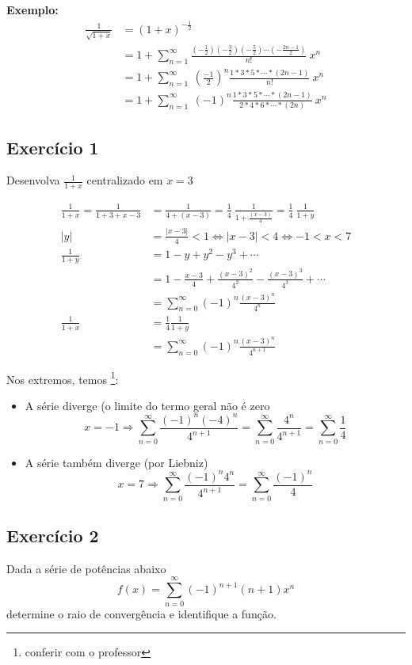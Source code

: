 \documentclass[12pt,openany, letterpaper]{book}
\newcommand{\soma}[2][n]{\sum_{{#1} = #2}^\infty}
\newcommand{\E}[1]{Exercício #1}
\begin{document}
{{\textbf{Exemplo:} \begin{align*}
    \frac{1}{\sqrt{1+x}} &= (1+x)^{-\frac{1}{2}} \\
    &= 1 + \soma{1} \frac{\left(-\frac{1}{2}\right) \left(-\frac{3}{2}\right) \left(-\frac{5}{2}\right) \cdots \left(-\frac{2n-1}{2}\right)}{n!} \ x^n \\
    &= 1 + \soma{1} \ \left(\frac{-1}{2}\right)^n \frac{1 * 3 * 5 * \cdots * (2n-1)}{n!} \ x^n \\
    &= 1 + \soma{1} \ (-1)^n \frac{1*3*5*\cdots*(2n-1)}{2*4*6*\cdots*(2n)} \ x^n
\end{align*}

\subsection*{\E 1} Desenvolva $\displaystyle{\frac{1}{1+x}}$ centralizado em $x=3$

\begin{align*}
    \frac{1}{1+x} = \frac{1}{1+3+x-3} &= \frac{1}{4 + (x-3)} = \frac{1}{4} \ \frac{1}{1 + \frac{(x-3)}{4}} = \frac{1}{4} \ \frac{1}{1+y} \\
    |y| &= \frac{|x-3|}{4} < 1 \Longleftrightarrow |x-3| < 4 \Longleftrightarrow -1 < x < 7 \\
    \frac{1}{1+y} &= 1 - y + y^2 - y^3 + \cdots \\
    &= 1 - \frac{x-3}{4} + \frac{(x-3)^2}{4^2} - \frac{(x-3)^3}{4^3} + \cdots \\
    &= \soma{0} (-1)^n \frac{(x-3)^n}{4^n} \\
    \frac{1}{1+x} &= \frac{1}{4} \frac{1}{1+y} \\
    &= \soma{0} (-1)^n \frac{(x-3)^n}{4^{n+1}}
\end{align*}

Nos extremos, temos \footnote{conferir com o professor}:\begin{itemize}
\item A série diverge (o limite do termo geral não é zero $$x =-1 \Rightarrow \soma{0}\frac{(-1)^n(-4)^n}{4^{n+1}} = \soma{0} \frac{4^n}{4^{n+1}} = \soma{0} \frac{1}{4} $$
\item A série também diverge (por Liebniz) $$x = 7 \Rightarrow \soma{0}\frac{(-1)^n 4^n}{4^{n+1}} = \soma{0} \frac{(-1)^n}{4} $$
\end{itemize}

\subsection*{\E 2} Dada a série de potências abaixo $$f(x) = \soma{0} (-1)^{n+1} (n+1)x^n$$ determine o raio de convergência e identifique a função.

}}
\end{document}
